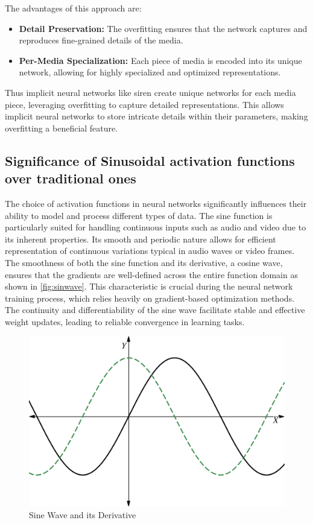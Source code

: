 \documentclass{ioereport}
\begin{document}
    The advantages of this approach are:

    \begin{itemize}
        \item \textbf{Detail Preservation:} The overfitting ensures that the network captures and reproduces fine-grained details of the media.
        \item \textbf{Per-Media Specialization:} Each piece of media is encoded into its unique network, allowing for highly specialized and optimized representations.
    \end{itemize}

    Thus implicit neural networks like \gls{siren} create unique networks for each media piece, leveraging overfitting to capture detailed representations. This allows implicit neural networks to store intricate details within their parameters, making overfitting a beneficial feature.
    
    
    \subsection{Significance of Sinusoidal activation functions over traditional ones}

    The choice of activation functions in neural networks significantly influences their ability to model and process different types of data. The sine function is particularly suited for handling continuous inputs such as audio and video due to its inherent properties. Its smooth and periodic nature allows for efficient representation of continuous variations typical in audio waves or video frames. The smoothness of both the sine function and its derivative, a cosine wave, ensures that the gradients are well-defined across the entire function domain as shown in \autoref{fig:sinwave}. This characteristic is crucial during the neural network training process, which relies heavily on gradient-based optimization methods. The continuity and differentiability of the sine wave facilitate stable and effective weight updates, leading to reliable convergence in learning tasks.

    \begin{figure}[H]
        \centering
        \includegraphics[height=0.25\textheight]{assets/sine-wave.png}
        \caption{Sine Wave and its Derivative}
        \label{fig:sinwave}
    \end{figure}
\end{document}
